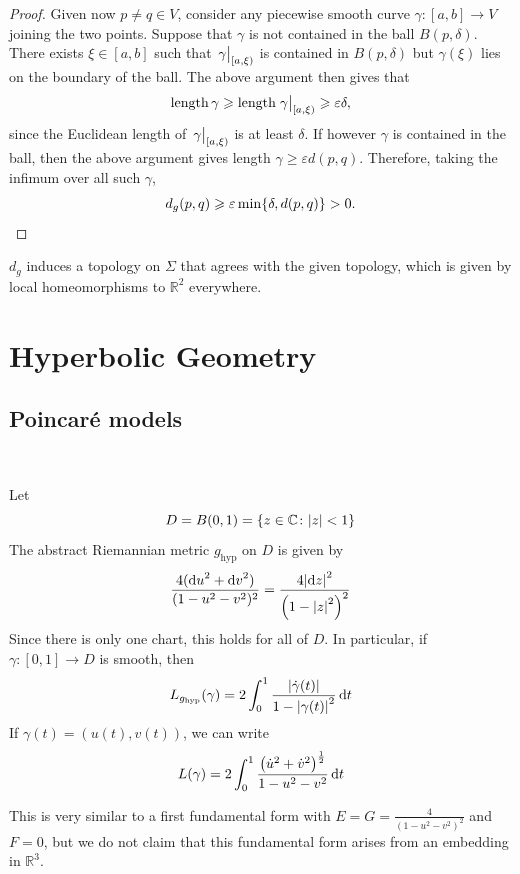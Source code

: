 \documentclass[a4paper]{article}
\begin{document}
\begin{proof}
	Given now $p \neq q \in V$, consider any piecewise smooth curve $\gamma:[a, b] \rightarrow V$ joining the two points. Suppose that $\gamma$ is not contained in the ball $B(p, \delta)$. There exists $\xi \in[a, b]$ such that $\teval{\gamma}{[a,\xi)}$ is contained in $B(p, \delta)$ but $\gamma(\xi)$ lies on the boundary of the ball. The above argument then gives that
	\[
	\operatorname{length} \gamma \geq \operatorname{length}\teval{\gamma}{[a,\xi)} \geq \varepsilon \delta,
	\]
	since the Euclidean length of $\teval{\gamma}{[a,\xi)}$ is at least $\delta$. If however $\gamma$ is contained in the ball, then the above argument gives length $\gamma \geq \varepsilon d(p, q)$. Therefore, taking the infimum over all such $\gamma$,
	\[
	d_g(p, q) \geq \varepsilon \min \{\delta, d(p, q)\}>0.\qedhere
	\]
\end{proof}

\begin{remark}
	\( d_g \) induces a topology on \( \Sigma \) that agrees with the given topology, which is given by local homeomorphisms to \( \mathbb R^2 \) everywhere.
\end{remark}

\section{Hyperbolic Geometry}
\subsection{Poincar\'{e} models}
\ \vspace*{-1.5em}
\begin{definition}
	Let
	\[
		D = B(0,1) = \qty{z \in \mathbb C \colon \abs{z} < 1}
	\]
	The abstract Riemannian metric \( g_{\mathrm{hyp}} \) on \( D \) is given by
	\[
		\frac{4(\dd{u}^2 + \dd{v}^2)}{(1-u^2-v^2)^2} = \frac{4 \abs{\dd{z}}^2}{\qty(1 - \abs{z}^2)^2}
	\]
	Since there is only one chart, this holds for all of \( D \).
	In particular, if \( \gamma \colon [0,1] \to D \) is smooth, then
	\[
		L_{g_{\mathrm{hyp}}}(\gamma) = 2 \int_0^1 \frac{\abs{\dot\gamma(t)}}{1 - \abs{\gamma(t)}^2} \dd{t}
	\]
	If \( \gamma(t) = (u(t), v(t)) \), we can write
	\[
		L(\gamma) = 2 \int_0^1 \frac{\qty(\dot u^2 + \dot v^2)^{\frac{1}{2}}}{1 - u^2 - v^2} \dd{t}
	\]
\end{definition}
This is very similar to a first fundamental form with \( E = G = \frac{4}{(1-u^2-v^2)^2} \) and \( F = 0 \), but we do not claim that this fundamental form arises from an embedding in \( \mathbb R^3 \).
\end{document}
